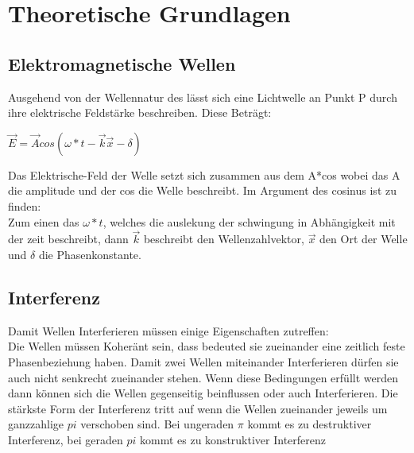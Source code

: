 \section{Theoretische Grundlagen}


  \subsection{Elektromagnetische Wellen}
Ausgehend von der Wellennatur des lässt sich eine Lichtwelle an Punkt P durch ihre elektrische Feldstärke beschreiben. Diese Beträgt:\\

\begin{center}
   ${\vec{E}=\vec{A}cos(\omega*t-\vec{k}\vec{x}-\delta)}$ %
\end{center}
Das Elektrische-Feld der Welle setzt sich zusammen aus dem A*cos wobei das A die amplitude und der cos die Welle beschreibt. Im Argument des cosinus ist zu finden:\\
Zum einen das $\omega*t$, welches die auslekung der schwingung in Abhängigkeit mit der zeit beschreibt, dann $\vec{k}$ beschreibt den Wellenzahlvektor, $\vec{x}$ den Ort der Welle und $\delta$ die Phasenkonstante.

\subsection{Interferenz}
Damit Wellen Interferieren müssen einige Eigenschaften zutreffen:\\
Die Wellen müssen Koheränt sein, 
dass bedeuted sie zueinander eine zeitlich feste Phasenbeziehung haben. Damit zwei Wellen miteinander Interferieren dürfen sie auch nicht senkrecht zueinander stehen. 
Wenn diese Bedingungen erfüllt werden dann können sich die Wellen gegenseitig beinflussen oder auch Interferieren. 
Die stärkste Form der Interferenz tritt auf wenn die Wellen zueinander jeweils um ganzzahlige $pi$ verschoben sind. 
Bei ungeraden $\pi$ kommt es zu destruktiver Interferenz, bei geraden $pi$ kommt es zu konstruktiver Interferenz